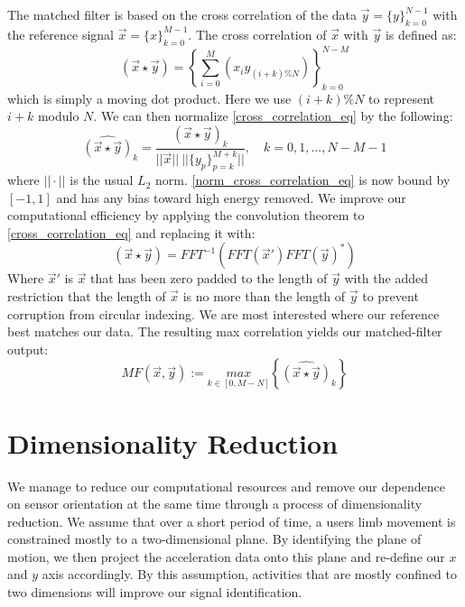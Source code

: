 \documentclass[journal]{IEEEtran}
\begin{document}
The matched filter is based on the cross correlation of the data $\vec{y} = \{y\}_{k=0}^{N-1}$ with the reference signal $\vec{x} = \{x\}_{k=0}^{M-1}$.
The cross correlation of $\vec{x}$ with $\vec{y}$ is defined as:
%
\begin{equation} \label{cross_correlation_eq}
(\vec{x} \star \vec{y}) = \left \{\sum_{i=0}^{M}(x_{i} y_{(i+k)\%N}) \right \}_{k=0}^{N-M}
\end{equation}
%
which is simply a moving dot product. Here we use $(i+k)\%N$ to represent $i+k$ modulo $N$.
We can then normalize \eqref{cross_correlation_eq} by the following:
%
\begin{equation} \label{norm_cross_correlation_eq}
\widehat{(\vec{x} \star \vec{y})}_k = \frac{(\vec{x} \star \vec{y})_k}{||\vec{x}|| \ || \{y_p\}_{p=k}^{M+k} || }, \quad k = 0,1,...,N-M-1
\end{equation}
%
where $|| \cdot ||$ is the usual $L_2$ norm. \eqref{norm_cross_correlation_eq} is now bound by $[-1,1]$ and has any bias toward high energy removed.
We improve our computational efficiency by applying the convolution theorem to \eqref{cross_correlation_eq} and replacing it with:
%
\begin{equation} \label{conv_theorem}
(\vec{x} \star \vec{y}) = FFT^{-1}(FFT(\vec{x}') FFT(\vec{y})^*)
\end{equation}
%
Where $\vec{x}'$ is $\vec{x}$ that has been zero padded to the length of $\vec{y}$ with the added restriction that the length of $\vec{x}$ is no more than the length of $\vec{y}$ to prevent corruption from circular indexing.
We are most interested where our reference best matches our data.
The resulting max correlation yields our matched-filter output:
%
\begin{equation} \label{matched_filter_eq}
MF(\vec{x},\vec{y}) := \underset{k \in [0, M-N]}{max} \left \{\widehat{(\vec{x} \star \vec{y})}_k \right \}
\end{equation}
%
\section{Dimensionality Reduction}
We manage to reduce our computational resources and remove our dependence on sensor orientation at the same time through a process of dimensionality reduction.
We assume that over a short period of time, a user\textquotesingle s limb movement is constrained mostly to a two-dimensional plane.
By identifying the plane of motion, we then project the acceleration data onto this plane and re-define our $x$ and $y$ axis accordingly.
By this assumption, activities that are mostly confined to two dimensions will improve our signal identification.
\end{document}
